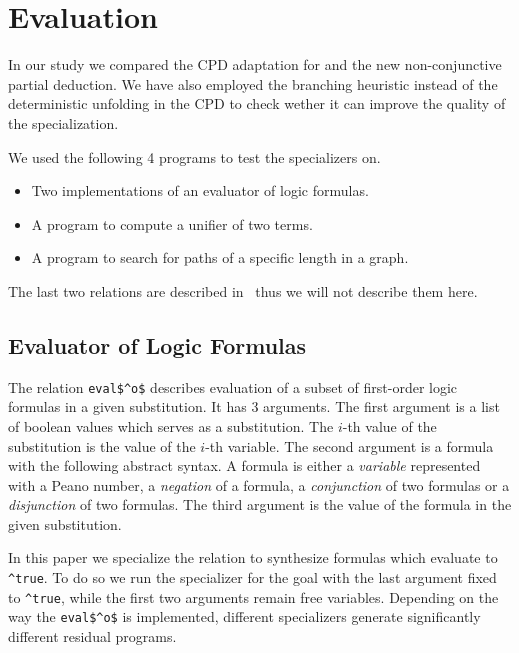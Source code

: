 \section{Evaluation}

In our study we compared the CPD adaptation for \mk{} and the new non-conjunctive partial deduction.
We have also employed the branching heuristic instead of the deterministic unfolding in the CPD to check wether it can improve the quality of the specialization.

We used the following 4 programs to test the specializers on.
\begin{itemize}
  \item Two implementations of an evaluator of logic formulas.
  \item A program to compute a unifier of two terms.
  \item A program to search for paths of a specific length in a graph.
\end{itemize}

The last two relations are described in~\cite{lozov2019relational} thus we will not describe them here.


\subsection{Evaluator of Logic Formulas}

The relation \lstinline{eval$^o$} describes evaluation of a subset of first-order logic formulas in a given substitution.
It has 3 arguments.
The first argument is a list of boolean values which serves as a substitution.
The $i$-th value of the substitution is the value of the $i$-th variable.
The second argument is a formula with the following abstract syntax.
A formula is either a \emph{variable} represented with a Peano number, a \emph{negation} of a formula, a \emph{conjunction} of two formulas or a \emph{disjunction} of two formulas.
The third argument is the value of the formula in the given substitution.

In this paper we specialize the relation to synthesize formulas which evaluate to \lstinline{^true}.
To do so we run the specializer for the goal with the last argument fixed to \lstinline{^true}, while the first two arguments remain free variables.
Depending on the way the \lstinline{eval$^o$} is implemented, different specializers generate significantly different residual programs.


